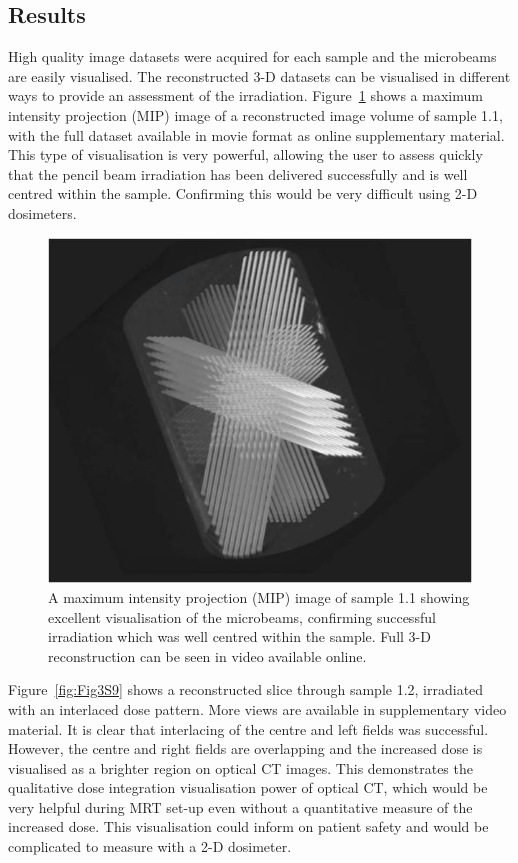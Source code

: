 \documentclass[12pt]{article}
\begin{document}
\subsection{Results}
High quality image datasets were acquired for each sample and the microbeams are easily visualised. The reconstructed 3-D datasets can be visualised in different ways to provide an assessment of the irradiation. Figure~\ref{fig:Fig2MIP} shows a maximum intensity projection (MIP) image of a reconstructed image volume of sample 1.1, with the full dataset available in movie format as online supplementary material. This type of visualisation is very powerful, allowing the user to assess quickly that the pencil beam irradiation has been delivered successfully and is well centred within the sample. Confirming this would be very difficult using 2-D dosimeters. 

\begin{figure}
\centering
\includegraphics[width=0.7\linewidth]{Fig2}
\caption{A maximum intensity projection (MIP) image of sample 1.1 showing excellent visualisation of the microbeams, confirming successful irradiation which was well centred within the sample. Full 3-D reconstruction can be seen in video available online.}
\label{fig:Fig2MIP}
\end{figure}


Figure~\ref{fig:Fig3S9} shows a reconstructed slice through sample 1.2, irradiated with an interlaced dose pattern. More views are available in supplementary video material. It is clear that interlacing of the centre and left fields was successful. However, the centre and right fields are overlapping and the increased dose is visualised as a brighter region on optical CT images. This demonstrates the qualitative dose integration visualisation power of optical CT, which would be very helpful during MRT set-up even without a quantitative measure of the increased dose. This visualisation could inform on patient safety and would be complicated to measure with a 2-D dosimeter. 
\end{document}
